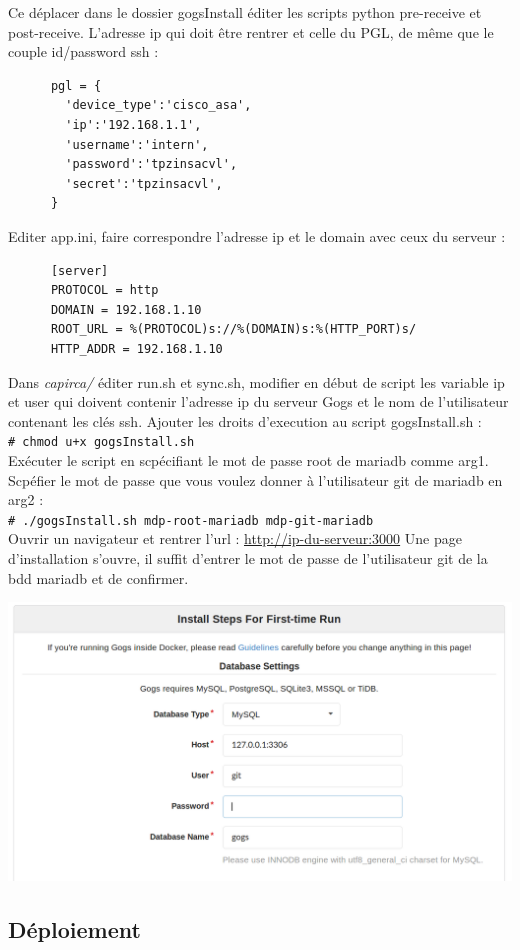 \documentclass{article}
\newcommand{\shellcmd}[1]{\\\indent\indent\texttt{\footnotesize\# #1}\\}
\begin{document}
      \noindent Ce déplacer dans le dossier gogsInstall éditer les scripts python pre-receive et post-receive.
      L'adresse ip qui doit être rentrer et celle du PGL, de même que le couple id/password ssh :
\begin{verbatim}
      pgl = {
        'device_type':'cisco_asa',
        'ip':'192.168.1.1',
        'username':'intern',
        'password':'tpzinsacvl',
        'secret':'tpzinsacvl',
      }
\end{verbatim}
      Editer app.ini, faire correspondre l'adresse ip et le domain avec ceux du serveur :
\begin{verbatim}
      [server]
      PROTOCOL = http
      DOMAIN = 192.168.1.10
      ROOT_URL = %(PROTOCOL)s://%(DOMAIN)s:%(HTTP_PORT)s/
      HTTP_ADDR = 192.168.1.10
\end{verbatim}
      Dans \textit{capirca/} éditer run.sh et sync.sh, modifier en début de script les variable ip et user qui doivent contenir l'adresse ip du serveur Gogs
      et le nom de l'utilisateur contenant les clés ssh.
      Ajouter les droits d'execution au script gogsInstall.sh : \shellcmd{chmod u+x gogsInstall.sh}
      Exécuter le script en scpécifiant le mot de passe root de mariadb comme arg1. Scpéfier le mot de passe que vous voulez donner
      à l'utilisateur git de mariadb en arg2 : \shellcmd{./gogsInstall.sh mdp-root-mariadb mdp-git-mariadb}
      Ouvrir un navigateur et rentrer l'url : \url{http://ip-du-serveur:3000} \smallbreak
      \noindent Une page d'installation s'ouvre, il suffit d'entrer le mot de passe de l'utilisateur git de la bdd mariadb et de confirmer.
\begin{center}
      \includegraphics[scale=0.2]{first-time-run.png}\smallbreak
\end{center}

    \subsection{Déploiement}
\end{document}
